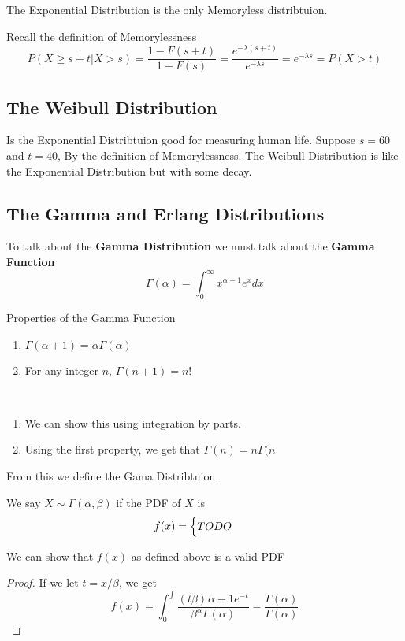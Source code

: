 \documentclass{report}
\begin{document}
The Exponential Distribution is the only Memoryless distribtuion.

Recall the definition of Memorylessness
\[
    P(X\ge s+t| X>s)=\frac{1-F(s+t)}{1-F(s)}
    =\frac{e^{-\lambda (s+t)}}{e^{-\lambda s}}
    =e^{-\lambda s}
    =P(X>t)
\]

\subsection{The Weibull Distribution}
Is the Exponential Distribtuion good for measuring human life. Suppose $s=60$
 and $t=40$, By the definition of Memorylessness.
 The Weibull Distribution is like the Exponential Distribution but with some decay.
 
\subsection{The Gamma and Erlang Distributions}
To talk about the \textbf{Gamma Distribution} we must talk about the \textbf{Gamma Function}
\[
    \Gamma(\alpha)=\int_0^\infty x^{\alpha - 1} e^x dx
\]
\begin{theorem}
    {Properties of the Gamma Function}
    \begin{enumerate}
        \item $\Gamma(\alpha+1)=\alpha\Gamma(\alpha)$
        \item For any integer $n$, $\Gamma(n+1)=n!$
    \end{enumerate}
    \
    \begin{enumerate}
        \item We can show this using integration by parts.
        \item Using the first property, we get that $\Gamma(n)=n\Gamma(n$\todo
    \end{enumerate}
\end{theorem}

From this we define the Gama Distribtuion
\begin{definition}
    We say $X\sim\Gamma(\alpha,\beta)$ if the PDF of $X$ is
    \[
        f(x)=\begin{cases}
            TODO\quad
        \end{cases}
    \]
\end{definition}
We can show that $f(x)$ as defined above is a valid PDF
\begin{proof}
    If we let $t=x/\beta$, we get
    \[
        f(x)=\int_0^\int \frac{(t\beta)^{}\alpha-1 e^{-t}}{\beta^{\alpha} \Gamma(\alpha)}=\frac{\Gamma(\alpha)}{\Gamma(\alpha)}
    \]
\end{proof}
\end{document}
